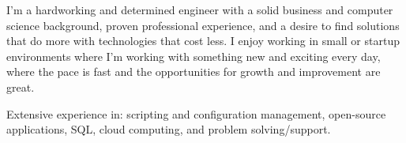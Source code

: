 \par{
I'm a hardworking and determined engineer with a solid business and computer
science background, proven professional experience, and a desire to find
solutions that do more with technologies that cost less. I enjoy working in
small or startup environments where I'm working with something new and exciting
every day, where the pace is fast and the opportunities for growth and
improvement are great.
}

\par{
Extensive experience in: scripting and configuration management, open-source
applications, SQL, cloud computing, and problem solving/support.
}
